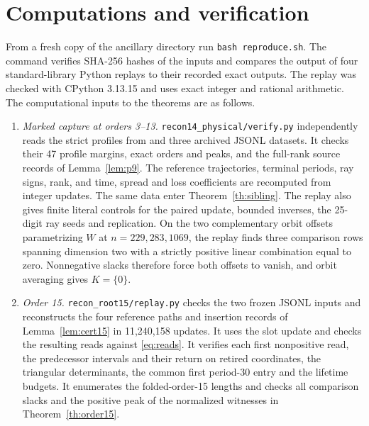 \documentclass[11pt]{amsart}
\theoremstyle{definition}
\begin{document}
\section{Computations and verification}\label{sec:verify}

From a fresh copy of the ancillary directory run
\texttt{bash reproduce.sh}. The command verifies SHA-256
hashes of the inputs and compares the output of four
standard-library Python replays to their recorded exact
outputs. The replay was checked with CPython 3.13.15 and uses exact integer
and rational arithmetic. The computational inputs to the theorems are
as follows.

\begin{enumerate}
\item \emph{Marked capture at orders 3--13.}
\texttt{recon14\_physical/verify.py} independently reads the
strict profiles from \cite{G9} and three archived JSONL
datasets. It checks their 47 profile margins, exact
orders and peaks, and the full-rank source records of
Lemma~\ref{lem:p9}. The reference trajectories, terminal
periods, ray signs, rank, and time, spread and loss
coefficients are recomputed from integer updates.
The same data enter Theorem~\ref{th:sibling}.
The replay also gives finite literal controls for
the paired update, bounded inverses, the 25-digit ray
seeds and replication. On the two complementary orbit offsets
parametrizing \(W\) at \(n=229,283,1069\), the replay finds three
comparison rows spanning dimension two with a strictly positive linear
combination equal to zero. Nonnegative slacks therefore force both
offsets to vanish, and orbit averaging gives \(K=\{0\}\).

\item \emph{Order 15.}
\texttt{recon\_root15/replay.py} checks the two frozen
JSONL inputs and reconstructs the four reference
paths and insertion records of Lemma~\ref{lem:cert15}
in 11,240,158 updates. It uses the slot update and
checks the resulting reads against \eqref{eq:reads}.
It verifies each first nonpositive read, the
predecessor intervals and their return on retired
coordinates, the triangular determinants, the common
first period-30 entry and the lifetime budgets.
It enumerates the folded-order-15 lengths and checks
all comparison slacks and the positive peak of the
normalized witnesses in Theorem~\ref{th:order15}.


\end{enumerate}
\end{document}
